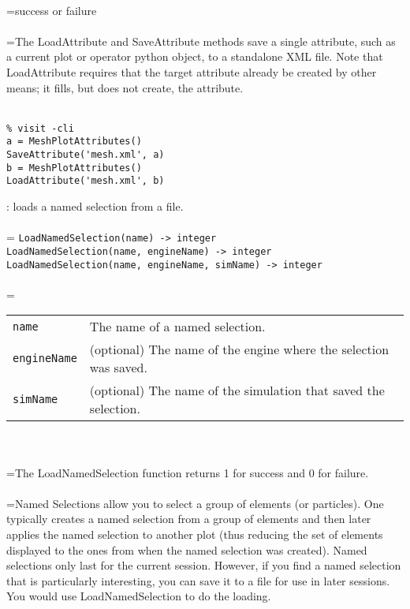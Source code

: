 \documentclass[10pt,a4paper]{report}
\begin{document}
 \\ 
\hangindent=\parindent success or failure \\[-3mm] 

 \\ 
\hangindent=\parindent The LoadAttribute and SaveAttribute methods save a single attribute, such as a current plot or operator python object, to a standalone XML file.  Note that LoadAttribute requires that the target attribute already be created by other means; it fills, but does not create, the attribute. \\[-3mm] 

\\[-6mm]
\begin{verbatim}% visit -cli
a = MeshPlotAttributes()
SaveAttribute('mesh.xml', a)
b = MeshPlotAttributes()
LoadAttribute('mesh.xml', b)
\end{verbatim}
\newpage


{}
: loads a named selection from a file.\\[-3mm]

 \\ 
\hangindent=\parindent 
\verb!LoadNamedSelection(name) -> integer!\\ 
\verb!LoadNamedSelection(name, engineName) -> integer!\\ 
\verb!LoadNamedSelection(name, engineName, simName) -> integer!\\ [-3mm]

 \\ 
\hangindent=\parindent 
\begin{tabular}{lp{9cm}}
\verb!name! & The name of a named selection. \\
\verb!engineName! & (optional) The name of the engine where the selection was saved. \\
\verb!simName! & (optional) The name of the simulation that saved the selection. \\
\end{tabular} \\[-2mm]


 \\ 
\hangindent=\parindent The LoadNamedSelection function returns 1 for success and 0 for failure. \\[-3mm] 

 \\ 
\hangindent=\parindent Named Selections allow you to select a group of elements (or particles). One typically creates a named selection from a group of elements and then later applies the named selection to another plot (thus reducing the set of elements displayed to the ones from when the named selection was created).  Named selections only last for the current session.  However,  if you find a named selection that is particularly interesting, you can  save it to a file for use in later sessions.  You would use  LoadNamedSelection to do the loading. \\[-3mm] 
\end{document}

